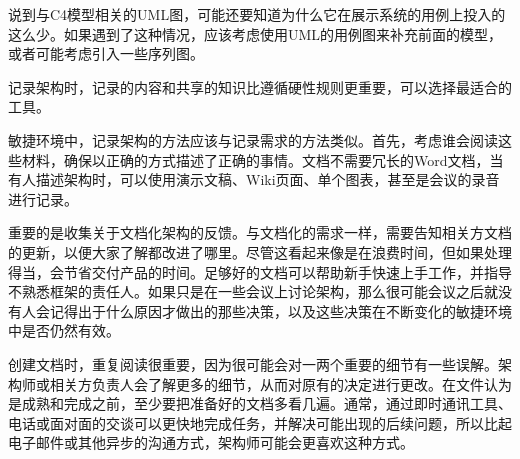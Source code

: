 说到与C4模型相关的UML图，可能还要知道为什么它在展示系统的用例上投入的这么少。如果遇到了这种情况，应该考虑使用UML的用例图来补充前面的模型，或者可能考虑引入一些序列图。

记录架构时，记录的内容和共享的知识比遵循硬性规则更重要，可以选择最适合的工具。


敏捷环境中，记录架构的方法应该与记录需求的方法类似。首先，考虑谁会阅读这些材料，确保以正确的方式描述了正确的事情。文档不需要冗长的Word文档，当有人描述架构时，可以使用演示文稿、Wiki页面、单个图表，甚至是会议的录音进行记录。

重要的是收集关于文档化架构的反馈。与文档化的需求一样，需要告知相关方文档的更新，以便大家了解都改进了哪里。尽管这看起来像是在浪费时间，但如果处理得当，会节省交付产品的时间。足够好的文档可以帮助新手快速上手工作，并指导不熟悉框架的责任人。如果只是在一些会议上讨论架构，那么很可能会议之后就没有人会记得出于什么原因才做出的那些决策，以及这些决策在不断变化的敏捷环境中是否仍然有效。

创建文档时，重复阅读很重要，因为很可能会对一两个重要的细节有一些误解。架构师或相关方负责人会了解更多的细节，从而对原有的决定进行更改。在文件认为是成熟和完成之前，至少要把准备好的文档多看几遍。通常，通过即时通讯工具、电话或面对面的交谈可以更快地完成任务，并解决可能出现的后续问题，所以比起电子邮件或其他异步的沟通方式，架构师可能会更喜欢这种方式。


























